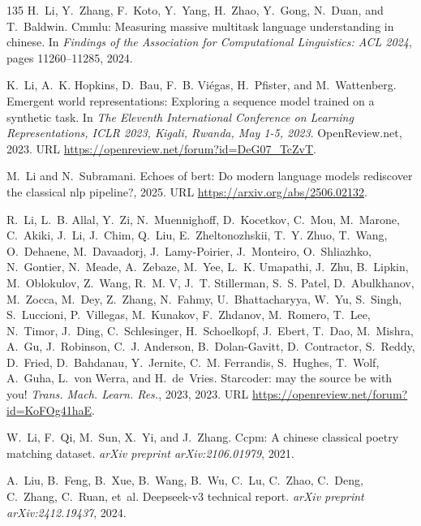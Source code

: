 \begin{thebibliography}{135}
H.~Li, Y.~Zhang, F.~Koto, Y.~Yang, H.~Zhao, Y.~Gong, N.~Duan, and T.~Baldwin.
\newblock Cmmlu: Measuring massive multitask language understanding in chinese.
\newblock In \emph{Findings of the Association for Computational Linguistics:
  ACL 2024}, pages 11260--11285, 2024.

K.~Li, A.~K. Hopkins, D.~Bau, F.~B. Vi{\'{e}}gas, H.~Pfister, and
  M.~Wattenberg.
\newblock Emergent world representations: Exploring a sequence model trained on
  a synthetic task.
\newblock In \emph{The Eleventh International Conference on Learning
  Representations, {ICLR} 2023, Kigali, Rwanda, May 1-5, 2023}. OpenReview.net,
  2023{}.
\newblock URL \url{https://openreview.net/forum?id=DeG07\_TcZvT}.

M.~Li and N.~Subramani.
\newblock Echoes of bert: Do modern language models rediscover the classical
  nlp pipeline?, 2025.
\newblock URL \url{https://arxiv.org/abs/2506.02132}.

R.~Li, L.~B. Allal, Y.~Zi, N.~Muennighoff, D.~Kocetkov, C.~Mou, M.~Marone,
  C.~Akiki, J.~Li, J.~Chim, Q.~Liu, E.~Zheltonozhskii, T.~Y. Zhuo, T.~Wang,
  O.~Dehaene, M.~Davaadorj, J.~Lamy{-}Poirier, J.~Monteiro, O.~Shliazhko,
  N.~Gontier, N.~Meade, A.~Zebaze, M.~Yee, L.~K. Umapathi, J.~Zhu, B.~Lipkin,
  M.~Oblokulov, Z.~Wang, R.~M. V, J.~T. Stillerman, S.~S. Patel, D.~Abulkhanov,
  M.~Zocca, M.~Dey, Z.~Zhang, N.~Fahmy, U.~Bhattacharyya, W.~Yu, S.~Singh,
  S.~Luccioni, P.~Villegas, M.~Kunakov, F.~Zhdanov, M.~Romero, T.~Lee,
  N.~Timor, J.~Ding, C.~Schlesinger, H.~Schoelkopf, J.~Ebert, T.~Dao,
  M.~Mishra, A.~Gu, J.~Robinson, C.~J. Anderson, B.~Dolan{-}Gavitt,
  D.~Contractor, S.~Reddy, D.~Fried, D.~Bahdanau, Y.~Jernite, C.~M. Ferrandis,
  S.~Hughes, T.~Wolf, A.~Guha, L.~von Werra, and H.~de~Vries.
\newblock Starcoder: may the source be with you!
\newblock \emph{Trans. Mach. Learn. Res.}, 2023, 2023{}.
\newblock URL \url{https://openreview.net/forum?id=KoFOg41haE}.

W.~Li, F.~Qi, M.~Sun, X.~Yi, and J.~Zhang.
\newblock Ccpm: A chinese classical poetry matching dataset.
\newblock \emph{arXiv preprint arXiv:2106.01979}, 2021.

A.~Liu, B.~Feng, B.~Xue, B.~Wang, B.~Wu, C.~Lu, C.~Zhao, C.~Deng, C.~Zhang,
  C.~Ruan, et~al.
\newblock Deepseek-v3 technical report.
\newblock \emph{arXiv preprint arXiv:2412.19437}, 2024{}.


\end{thebibliography}
